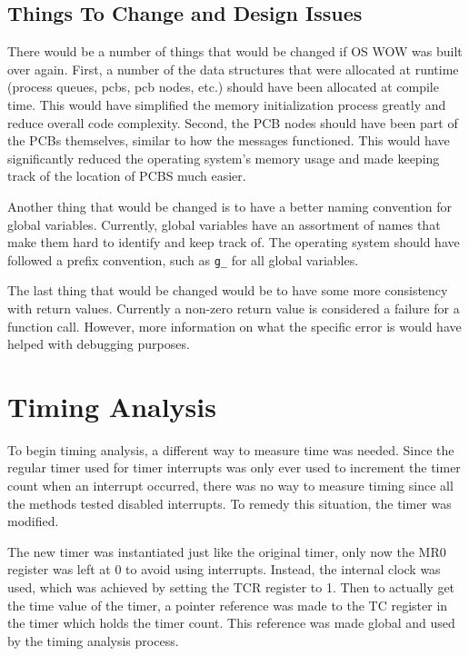 \documentclass[se]{uw-wkrpt}
\begin{document}
\subsection{Things To Change and Design Issues}

There would be a number of things that would be changed if OS WOW was built over again. First, a number of the data structures that were allocated at runtime (process queues, pcbs, pcb nodes, etc.) should have been allocated at compile time. This would have simplified the memory initialization process greatly and reduce overall code complexity. Second, the PCB nodes should have been part of the PCBs themselves, similar to how the messages functioned. This would have significantly reduced the operating system's memory usage and made keeping track of the location of PCBS much easier.

Another thing that would be changed is to have a better naming convention for global variables. Currently, global variables have an assortment of names that make them hard to identify and keep track of. The operating system should have followed a prefix convention, such as \texttt{g\_} for all global variables.

The last thing that would be changed would be to have some more consistency with return values. Currently a non-zero return value is considered a failure for a function call. However, more information on what the specific error is would have helped with debugging purposes.

\section{Timing Analysis}\label{sec:time}

To begin timing analysis, a different way to measure time was needed. Since the regular timer used for timer interrupts was only ever used to increment the timer count when an interrupt occurred, there was no way to measure timing since all the methods tested disabled interrupts. To remedy this situation, the timer was modified.

The new timer was instantiated just like the original timer, only now the MR0 register was left at 0 to avoid using interrupts. Instead, the internal clock was used, which was achieved by setting the TCR register to 1. Then to actually get the time value of the timer, a pointer reference was made to the TC register in the timer which holds the timer count. This reference was made global and used by the timing analysis process. 
\end{document}
